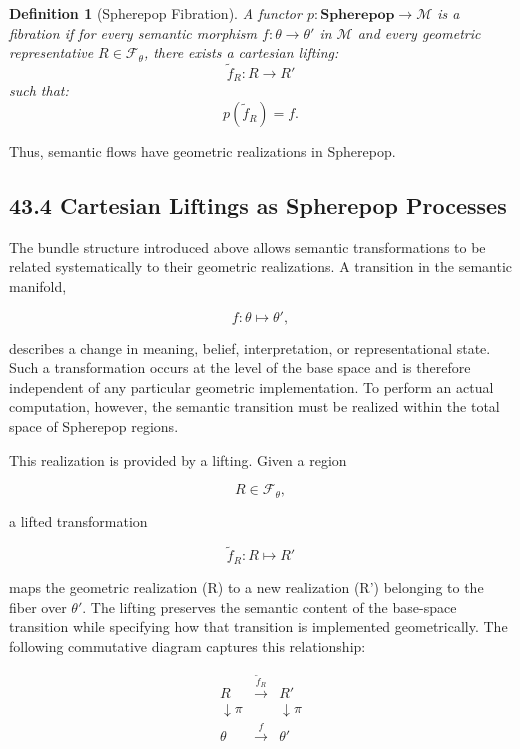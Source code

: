 \documentclass[12pt,letterpaper]{article}
\newtheorem{definition}[theorem]{Definition}
\theoremstyle{remark}
\begin{document}
\begin{definition}[Spherepop Fibration]
A functor $p : \mathbf{Spherepop} \to \mathcal{M}$ is a fibration if for every semantic morphism $f : \theta \to \theta'$ in $\mathcal{M}$ and every geometric representative $R \in \mathcal{F}_\theta$, there exists a \emph{cartesian lifting}:
\[
\widetilde{f}_R : R \to R'
\]
such that:
\[
p(\widetilde{f}_R) = f.
\]
\end{definition}

Thus, semantic flows have geometric realizations in Spherepop.

\subsection{43.4 Cartesian Liftings as Spherepop Processes}

The bundle structure introduced above allows semantic transformations to be related systematically to their geometric realizations. A transition in the semantic manifold,

\[
f : \theta \mapsto \theta',
\]

describes a change in meaning, belief, interpretation, or representational state. Such a transformation occurs at the level of the base space and is therefore independent of any particular geometric implementation. To perform an actual computation, however, the semantic transition must be realized within the total space of Spherepop regions.

This realization is provided by a lifting. Given a region

\[
R \in \mathcal{F}_{\theta},
\]

a lifted transformation

\[
\widetilde{f}_R : R \mapsto R'
\]

maps the geometric realization (R) to a new realization (R') belonging to the fiber over $\theta'$. The lifting preserves the semantic content of the base-space transition while specifying how that transition is implemented geometrically. The following commutative diagram captures this relationship:

\[
\begin{array}{ccc}
R & \xrightarrow{\widetilde{f}_R} & R' \\
\downarrow \pi & & \downarrow \pi \\
\theta & \xrightarrow{f} & \theta'
\end{array}
\]
\end{document}
